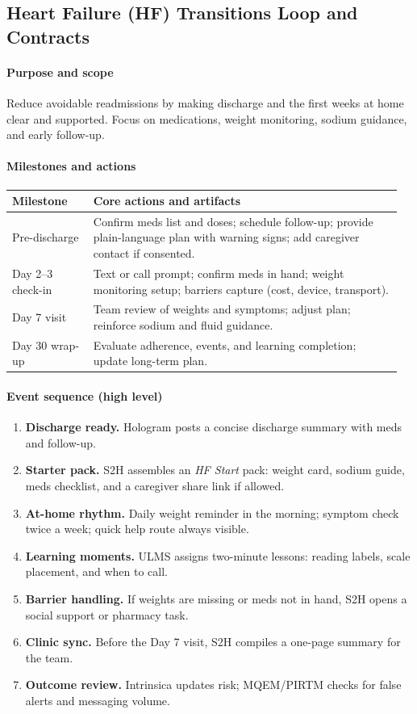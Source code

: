 \documentclass[12pt]{article}
\begin{document}
\subsection*{Heart Failure (HF) Transitions Loop and Contracts}
\paragraph{Purpose and scope}
Reduce avoidable readmissions by making discharge and the first weeks at home clear and supported. Focus on medications, weight monitoring, sodium guidance, and early follow-up.

\paragraph{Milestones and actions}
\begin{longtable}{@{}p{0.20\linewidth}p{0.76\linewidth}@{}}
\toprule
\textbf{Milestone} & \textbf{Core actions and artifacts} \\
\midrule
\endhead
Pre-discharge & Confirm meds list and doses; schedule follow-up; provide plain-language plan with warning signs; add caregiver contact if consented. \\
Day 2–3 check-in & Text or call prompt; confirm meds in hand; weight monitoring setup; barriers capture (cost, device, transport). \\
Day 7 visit & Team review of weights and symptoms; adjust plan; reinforce sodium and fluid guidance. \\
Day 30 wrap-up & Evaluate adherence, events, and learning completion; update long-term plan. \\
\bottomrule
\end{longtable}

\paragraph{Event sequence (high level)}
\begin{enumerate}[leftmargin=*]
  \item \textbf{Discharge ready.} Hologram posts a concise discharge summary with meds and follow-up.
  \item \textbf{Starter pack.} S2H assembles an \emph{HF Start} pack: weight card, sodium guide, meds checklist, and a caregiver share link if allowed.
  \item \textbf{At-home rhythm.} Daily weight reminder in the morning; symptom check twice a week; quick help route always visible.
  \item \textbf{Learning moments.} ULMS assigns two-minute lessons: reading labels, scale placement, and when to call.
  \item \textbf{Barrier handling.} If weights are missing or meds not in hand, S2H opens a social support or pharmacy task.
  \item \textbf{Clinic sync.} Before the Day 7 visit, S2H compiles a one-page summary for the team.
  \item \textbf{Outcome review.} Intrinsica updates risk; MQEM/PIRTM checks for false alerts and messaging volume.
\end{enumerate}
\end{document}
